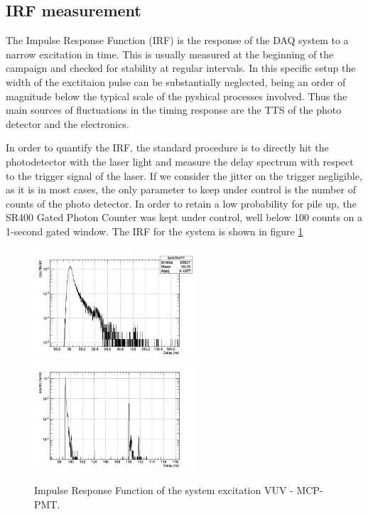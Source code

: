 \subsection{IRF measurement}
The Impulse Response Function (IRF) is the response of the DAQ system to a narrow excitation in time. This is usually measured at the beginning of the campaign and checked for stability at regular intervals.
In this specific setup the width of the exctitaion pulse can be substantially neglected, being an order of magnitude below the typical scale of the pyshical processes involved. Thus the main sources of fluctuations in the timing response are the TTS of the photo detector and the electronics.

In order to quantify the IRF, the standard procedure is to directly hit the photodetector with the laser light and measure the delay spectrum with respect to the trigger signal of the laser.
If we consider the jitter on the trigger negligible, as it is in most cases, the only parameter to keep under control is the number of counts of the photo detector. 
In order to retain a low probability for pile up, the SR400 Gated Photon Counter was kept under control, well below 100 counts on a 1-second gated window. 
The IRF for the system is shown in figure \ref{fig:IRF}
\begin{figure}[htbp]
\begin{center}
\includegraphics[width=6cm]{../Pictures/Chapter_7/IRF_simple.png}
\includegraphics[width=6cm]{../Pictures/Chapter_7/long.png}
\end{center}
\caption[VUV setup IRF]{Impulse Response Function of the system excitation VUV - MCP-PMT.}
\label{fig:IRF}
\end{figure}

